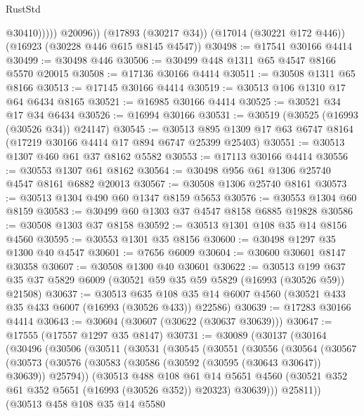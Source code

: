 \begin{lexlean}{RustStd}
\begin{coremodule}
{\begin{coremodule}
{{{{{{{{{{{{{{{{{{{{{{{{{{{{{{{{{{{{{{{{{{{{{{{{{{{{{{{                  @30410)))))
        @20096))
    (@17893 (@30217 @34))
    (@17014 (@30221 @172 @446))
    (@16923 (@30228 @446 @615 @8145 @4547))
@30498 := @17541 @30166 @4414
@30499 := @30498 @446
@30506 := @30499 @448 @1311 @65 @4547 @8166 @5570 @20015
@30508 := @17136 @30166 @4414
@30511 := @30508 @1311 @65 @8166
@30513 := @17145 @30166 @4414
@30519 := @30513 @106 @1310 @17 @64 @6434 @8165
@30521 := @16985 @30166 @4414
@30525 := @30521 @34 @17 @34 @6434
@30526 := @16994 @30166
@30531 := @30519 (@30525 (@16993 (@30526 @34)) @24147)
@30545 := @30513 @895 @1309 @17 @63 @6747 @8164 (@17219 @30166 @4414 @17 @894 @6747 @25399 @25403)
@30551 := @30513 @1307 @460 @61 @37 @8162 @5582
@30553 := @17113 @30166 @4414
@30556 := @30553 @1307 @61 @8162
@30564 := @30498 @956 @61 @1306 @25740 @4547 @8161 @6882 @20013
@30567 := @30508 @1306 @25740 @8161
@30573 := @30513 @1304 @490 @60 @1347 @8159 @5653
@30576 := @30553 @1304 @60 @8159
@30583 := @30499 @60 @1303 @37 @4547 @8158 @6885 @19828
@30586 := @30508 @1303 @37 @8158
@30592 := @30513 @1301 @108 @35 @14 @8156 @4560
@30595 := @30553 @1301 @35 @8156
@30600 := @30498 @1297 @35 @1300 @40 @4547
@30601 := @7656 @6009
@30604 := @30600 @30601 @8147 @30358
@30607 := @30508 @1300 @40 @30601
@30622 := @30513
    @199
    @637
    @35
    @37
    @5829
    @6009
    (@30521 @59 @35 @59 @5829 (@16993 (@30526 @59)) @21508)
@30637 := @30513
    @635
    @108
    @35
    @14
    @6007
    @4560
    (@30521 @433 @35 @433 @6007 (@16993 (@30526 @433)) @22586)
@30639 := @17283 @30166 @4414
@30643 := @30604 (@30607 (@30622 (@30637 @30639)))
@30647 := @17555 (@17557 @1297 @35 @8147)
@30731 := @30089
    (@30137
      (@30164
        (@30496
          (@30506
            (@30511
              (@30531
                (@30545
                  (@30551
                    (@30556
                      (@30564
                        (@30567
                          (@30573
                            (@30576
                              (@30583 (@30586 (@30592 (@30595 (@30643 @30647)) @30639)) @25794))
                            (@30513
                              @488
                              @108
                              @61
                              @14
                              @5651
                              @4560
                              (@30521 @352 @61 @352 @5651 (@16993 (@30526 @352)) @20323)
                              @30639)))
                        @25811))
                    (@30513
                      @458
                      @108
                      @35
                      @14
                      @5580
}}}}}}}}}}}}}}}}}}}}}}}}}}}}}}}}}}}}}}}}}}}}}}}}}}}}}}}
\end{coremodule}}
\end{coremodule}
\end{lexlean}

